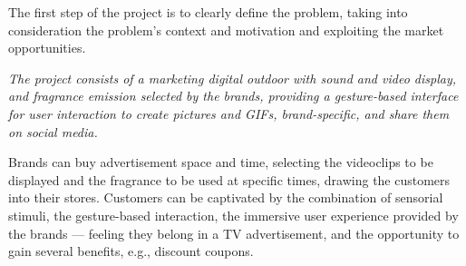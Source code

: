 The first step of the project is to clearly define the problem, taking into
consideration the problem's context and motivation and exploiting the market opportunities.

\emph{The project consists of a marketing digital outdoor with sound and
video display, and fragrance emission selected by the brands, providing a gesture-based interface for
user interaction to create pictures and GIFs, brand-specific, and share them on
social media.}

Brands can buy advertisement space and time, selecting the videoclips to be
displayed and the fragrance to be used at specific times, drawing the customers
into their stores. Customers can be captivated by the combination of sensorial
stimuli, the gesture-based interaction, the immersive user experience provided
by the brands --- feeling they belong in a TV advertisement, and the opportunity
to gain several benefits, e.g., discount coupons.
